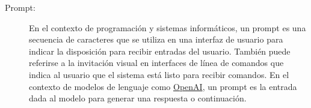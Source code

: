 \begin{description}
    \item [Prompt:] En el contexto de programación y sistemas informáticos, un prompt es una secuencia de caracteres que se utiliza en una interfaz de usuario para indicar la disposición para recibir entradas del usuario. También puede referirse a la invitación visual en interfaces de línea de comandos que indica al usuario que el sistema está listo para recibir comandos. En el contexto de modelos de lenguaje como \href{https://www.openai.com/}{OpenAI}, un prompt es la entrada dada al modelo para generar una respuesta o continuación.
\end{description}
